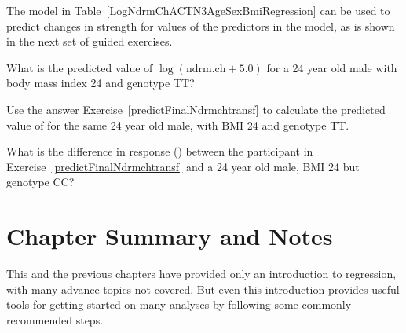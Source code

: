 The model in Table~\ref{LogNdrmChACTN3AgeSexBmiRegression} can be used to predict changes in strength for values of the predictors in the model, as is shown in the next set of guided exercises.

\begin{exercise}
What is the predicted value of $\log(\text{ndrm.ch} + 5.0)$ for a 24 year old male with body mass index 24 and genotype TT?
\label{predictFinalNdrmchtransf}
\end{exercise}

\begin{exercise}
Use the answer Exercise~\ref{predictFinalNdrmchtransf} to calculate the predicted value of  for the same 24 year old male, with BMI 24 and genotype TT.
\end{exercise}

\begin{exercise}
What is the difference in response ()  between the participant in Exercise~\ref{predictFinalNdrmchtransf} and a 24 year old male, BMI 24 but genotype CC?
\end{exercise}




\section{Chapter Summary and Notes}

This and the previous chapters have provided only an introduction to regression, with many advance topics not covered. But even this introduction provides useful tools for getting started on many analyses by following some commonly recommended steps.

